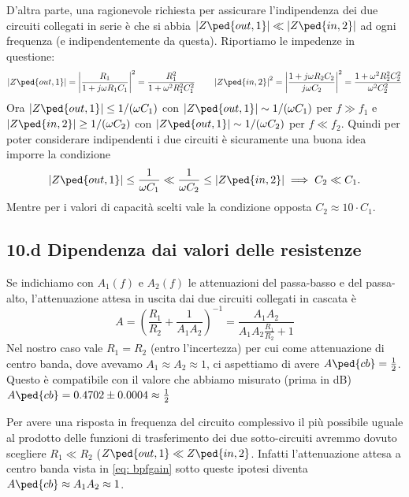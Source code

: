\documentclass[10pt,a4paper]{article}
\begin{document}
D'altra parte, una ragionevole richiesta per assicurare l'indipendenza dei due
circuiti collegati in serie è che si abbia
$\abs{Z\ped{out, 1}} \ll \abs{Z\ped{in,2}}$ ad ogni frequenza (e 
indipendentemente da questa). Riportiamo le impedenze in questione:
\[
\abs{Z\ped{out, 1}} = \abs{\frac{R_1}{1 + j \omega R_1 C_1}}^2 = 
\frac{R_1^2}{1 + \omega^2 R_1^2 C_1^2}
\qquad
\abs{Z\ped{in, 2}}^2 = \abs{\frac{1 + j \omega R_2 C_2}{j\omega 
C_2}}^2 = \frac{1 + \omega^2 R_2^2 C_2^2}{\omega^2 C_2^2}
\]
Ora $\abs{Z\ped{out, 1}} \leq 1/(\omega C_1)$ con $\abs{Z\ped{out, 
1}} \sim 1/(\omega C_1)$ per $f \gg f_1 $ e $\abs{Z\ped{in, 2}} 
\geq 1/(\omega C_2)$ con $\abs{Z\ped{out, 1}} \sim 1/(\omega C_2) 
$ per $ f \ll f_2 $. Quindi per poter considerare indipendenti i due circuiti
è sicuramente una buona idea imporre la condizione
\[
\abs{Z\ped{out, 1}} \leq \frac{1}{\omega C_1} \ll \frac{1}{\omega C_2} \leq 
\abs{Z\ped{in, 2}} \implies C_2 \ll C_1.
\]
Mentre per i valori di capacità scelti vale la condizione opposta
$C_2 \approx 10 \cdot C_1$.

\subsection*{10.d Dipendenza dai valori delle resistenze}
Se indichiamo con $A_1(f)$ e $A_2(f)$ le attenuazioni del passa-basso e del
passa-alto, l'attenuazione attesa in uscita dai due circuiti collegati in
cascata è
\begin{equation}\label{eq: bpfgain}
A = \left(\frac{R_1}{R_2} + \frac{1}{A_1 A_2}\right)^{-1} = 
\frac{A_1 A_2}{A_1 A_2 \frac{R_1}{R_2} + 1} 
\end{equation}
Nel nostro caso vale $R_1 = R_2$ (entro l'incertezza) per cui come
attenuazione di centro banda, dove avevamo $A_1 \approx A_2 \approx 1$, ci
aspettiamo di avere $A\ped{cb} = \frac{1}{2}$.
Questo è compatibile con il valore che abbiamo misurato (prima in dB)
$A\ped{cb} = 0.4702 \pm 0.0004 \approx \frac{1}{2}$

Per avere una risposta in frequenza del circuito complessivo il più possibile
uguale al prodotto delle funzioni di trasferimento dei due sotto-circuiti
avremmo dovuto scegliere $R_1 \ll R_2$ ($Z\ped{out, 1} \ll Z\ped{in, 2}$.
Infatti l'attenuazione attesa a centro banda vista in \eqref{eq: bpfgain}
sotto queste ipotesi diventa $A\ped{cb} \approx A_1 A_2 \approx 1$.
\end{document}
